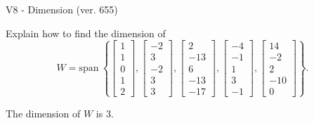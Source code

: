 \begin{exercise}
  \begin{exerciseTitle}V8 - Dimension (ver. 655)\end{exerciseTitle}
  \begin{exerciseStatement}
    Explain how to find the dimension of 
\[W=\mathrm{span}\ \left\{\left[\begin{array}{r}
1 \\
1 \\
0 \\
1 \\
2
\end{array}\right] , \left[\begin{array}{r}
-2 \\
3 \\
-2 \\
3 \\
3
\end{array}\right] , \left[\begin{array}{r}
2 \\
-13 \\
6 \\
-13 \\
-17
\end{array}\right] , \left[\begin{array}{r}
-4 \\
-1 \\
1 \\
3 \\
-1
\end{array}\right] , \left[\begin{array}{r}
14 \\
-2 \\
2 \\
-10 \\
0
\end{array}\right]\right\}.\]



  \end{exerciseStatement}
  \begin{exerciseAnswer}
   The dimension of \(W\) is  \(3\).
  


  \end{exerciseAnswer}
\end{exercise}